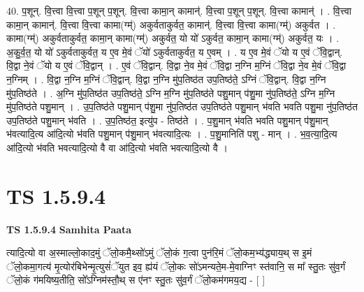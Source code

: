 \documentclass[17pt]{extarticle}
\begin{document}
40. प॒शून्. वि॒त्त्वा वि॒त्त्वा प॒शून् प॒शून्. वि॒त्त्वा कामा॒न् कामान्॑. वि॒त्त्वा प॒शून् प॒शून्. वि॒त्त्वा कामान्॑ । . वि॒त्त्वा कामा॒न् कामान्॑. वि॒त्त्वा वि॒त्त्वा कामा(ग्म्॑) अकुर्वताकुर्वत॒ कामान्॑. वि॒त्त्वा वि॒त्त्वा कामा(ग्म्॑) अकुर्वत । . कामा(ग्म्॑) अकुर्वताकुर्वत॒ कामा॒न् कामा(ग्म्॑) अकुर्वत॒ यो यो॑ ऽकुर्वत॒ कामा॒न् कामा(ग्म्॑) अकुर्वत॒ यः । . अ॒कु॒र्व॒त॒ यो यो॑ ऽकुर्वताकुर्वत॒ य ए॒व मे॒वं ॅयो॑ ऽकुर्वताकुर्वत॒ य ए॒वम् । . य ए॒व मे॒वं ॅयो य ए॒वं ॅवि॒द्वान्. वि॒द्वा ने॒वं ॅयो य ए॒वं ॅवि॒द्वान् । . ए॒वं ॅवि॒द्वान्. वि॒द्वा ने॒व मे॒वं ॅवि॒द्वा न॒ग्नि म॒ग्निं ॅवि॒द्वा ने॒व मे॒वं ॅवि॒द्वा न॒ग्निम् । . वि॒द्वा न॒ग्नि म॒ग्निं ॅवि॒द्वान्. वि॒द्वा न॒ग्नि मु॑प॒तिष्ठ॑त उप॒तिष्ठ॑ते॒ ऽग्निं ॅवि॒द्वान्. वि॒द्वा न॒ग्नि मु॑प॒तिष्ठ॑ते । . अ॒ग्नि मु॑प॒तिष्ठ॑त उप॒तिष्ठ॑ते॒ ऽग्नि म॒ग्नि मु॑प॒तिष्ठ॑ते पशु॒मान् प॑शु॒मा नु॑प॒तिष्ठ॑ते॒ ऽग्नि म॒ग्नि मु॑प॒तिष्ठ॑ते पशु॒मान् । . उ॒प॒तिष्ठ॑ते पशु॒मान् प॑शु॒मा नु॑प॒तिष्ठ॑त उप॒तिष्ठ॑ते पशु॒मान् भ॑वति भवति पशु॒मा नु॑प॒तिष्ठ॑त उप॒तिष्ठ॑ते पशु॒मान् भ॑वति । . उ॒प॒तिष्ठ॑त॒ इत्यु॑प - तिष्ठ॑ते । . प॒शु॒मान् भ॑वति भवति पशु॒मान् प॑शु॒मान् भ॑वत्यादि॒त्य आ॑दि॒त्यो भ॑वति पशु॒मान् प॑शु॒मान् भ॑वत्यादि॒त्यः । . प॒शु॒मानिति॑ पशु - मान् । . भ॒व॒त्या॒दि॒त्य आ॑दि॒त्यो भ॑वति भवत्यादि॒त्यो वै वा आ॑दि॒त्यो भ॑वति भवत्यादि॒त्यो वै । \newline
\pagebreak
{}
\section*{ TS 1.5.9.4 }

\textbf{TS 1.5.9.4 } \newline
\textbf{Samhita Paata} \newline

त्यादि॒त्यो वा अ॒स्माल्लो॒काद॒मुं ॅलो॒कमै॒थ्सो॑ऽमुं ॅलो॒कं ग॒त्वा पुन॑रि॒मं ॅलो॒कम॒भ्य॑द्ध्याय॒थ् स इ॒मं ॅलो॒कमा॒गत्य॑ मृ॒त्योर॑बिभेन्मृ॒त्युसं॑ॅयुत इव॒ ह्य॑यं ॅलो॒कः सो॑ऽमन्यते॒म-मे॒वाग्निꣳ स्त॑वानि॒ स मा᳚ स्तु॒तः सु॑व॒र्गं ॅलो॒कं ग॑मयिष्य॒तीति॒ सो᳚ऽग्निम॑स्तौ॒थ् स ए॑नꣳ स्तु॒तः सु॑व॒र्गं ॅलो॒कम॑गमय॒द्य - [ ] \newline
\end{document}
